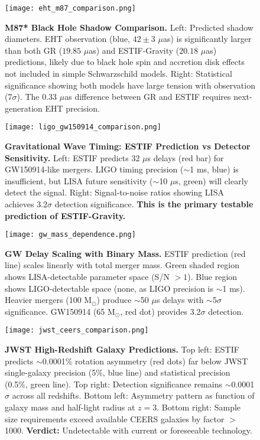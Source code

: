 \documentclass[12pt]{article}
\begin{document}
\begin{figure}[h!]
\centering
\texttt{[image: eht\_m87\_comparison.png]}
\caption{\textbf{M87* Black Hole Shadow Comparison.} Left: Predicted shadow diameters. EHT observation (blue, $42 \pm 3$ $\mu$as) is significantly larger than both GR ($19.85$ $\mu$as) and ESTIF-Gravity ($20.18$ $\mu$as) predictions, likely due to black hole spin and accretion disk effects not included in simple Schwarzschild models. Right: Statistical significance showing both models have large tension with observation (7$\sigma$). The 0.33 $\mu$as difference between GR and ESTIF requires next-generation EHT precision.}
\label{fig:eht}
\end{figure}

\begin{figure}[h!]
\centering
\texttt{[image: ligo\_gw150914\_comparison.png]}
\caption{\textbf{Gravitational Wave Timing: ESTIF Prediction vs Detector Sensitivity.} Left: ESTIF predicts $32$ $\mu$s delays (red bar) for GW150914-like mergers. LIGO timing precision ($\sim$1 ms, blue) is insufficient, but LISA future sensitivity ($\sim$10 $\mu$s, green) will clearly detect the signal. Right: Signal-to-noise ratios showing LISA achieves $3.2\sigma$ detection significance. \textbf{This is the primary testable prediction of ESTIF-Gravity.}}
\label{fig:ligo_primary}
\end{figure}

\begin{figure}[h!]
\centering
\texttt{[image: gw\_mass\_dependence.png]}
\caption{\textbf{GW Delay Scaling with Binary Mass.} ESTIF prediction (red line) scales linearly with total merger mass. Green shaded region shows LISA-detectable parameter space (S/N $> 1$). Blue region shows LIGO-detectable space (none, as LIGO precision is $\sim$1 ms). Heavier mergers (100 M$_\odot$) produce $\sim$50 $\mu$s delays with $\sim$5$\sigma$ significance. GW150914 (65 M$_\odot$, red dot) provides 3.2$\sigma$ detection.}
\label{fig:gw_mass}
\end{figure}

\begin{figure}[h!]
\centering
\texttt{[image: jwst\_ceers\_comparison.png]}
\caption{\textbf{JWST High-Redshift Galaxy Predictions.} Top left: ESTIF predicts $\sim$0.0001\% rotation asymmetry (red dots) far below JWST single-galaxy precision (5\%, blue line) and statistical precision (0.5\%, green line). Top right: Detection significance remains $\sim$0.0001$\sigma$ across all redshifts. Bottom left: Asymmetry pattern as function of galaxy mass and half-light radius at $z=3$. Bottom right: Sample size requirements exceed available CEERS galaxies by factor $>$1000. \textbf{Verdict:} Undetectable with current or foreseeable technology.}
\label{fig:jwst}
\end{figure}
\end{document}
